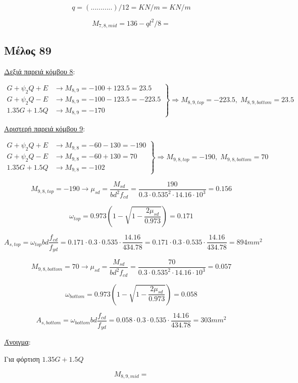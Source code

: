 \[
q = (...........)/12 =  KN/m =  KN/m
\]

\[
M_{7,8,mid} = 136 - ql^2/8 =
\]

\subsection{Μέλος 89}

\noindent
\underline{Δεξιά παρειά κόμβου 8}:

\[
\left.
   \begin{array}{ll}
       G+\psi_2 Q + Ε & \rightarrow M_{8,9} = -100+123.5 = 23.5 \\
       G+\psi_2 Q - Ε & \rightarrow M_{8,9} = -100-123.5 = -223.5 \\
       1.35G + 1.5Q     & \rightarrow M_{8,9} = -170
   \end{array}
\right \} \Rightarrow M_{8,9,top} = -223.5,\; M_{8,9,bottom} = 23.5
\]

\noindent
\underline{Αριστερή παρειά κόμβου 9}:

\[
\left.
   \begin{array}{ll}
       G+\psi_2 Q + Ε & \rightarrow M_{9,8} = -60-130 = -190 \\
       G+\psi_2 Q - Ε & \rightarrow M_{9,8} = -60+130 = 70 \\
       1.35G + 1.5Q     & \rightarrow M_{9,8} = -102
   \end{array}
\right \} \Rightarrow M_{9,8,top} = -190,\; M_{9,8,bottom} = 70
\]

\[
M_{9,8,top} = -190 \rightarrow \mu_{sd} = \dfrac{M_{sd}}{b d^2 f_{cd}} = \dfrac{190}{0.3\cdot0.535^2\cdot14.16\cdot10^3} = 0.156
\]

\[
\omega_{top} = 0.973\left( 1 - \sqrt{1 - \dfrac{2\mu_{sd}}{0.973}} \right) = 0.171
\]

\[
A_{s,top} = \omega_{top}b d \dfrac{f_{cd}}{f_{yd}} = 0.171\cdot 0.3 \cdot 0.535 \cdot \dfrac{14.16}{434.78} = 0.171\cdot 0.3 \cdot 0.535 \cdot \dfrac{14.16}{434.78} = 894mm^2
\]

\[
M_{9,8,bottom} = 70 \rightarrow \mu_{sd} = \dfrac{M_{sd}}{b d^2 f_{cd}} = \dfrac{70}{0.3\cdot0.535^2\cdot14.16\cdot10^3} = 0.057
\]

\[
\omega_{bottom} = 0.973\left( 1 - \sqrt{1 - \dfrac{2\mu_{sd}}{0.973}} \right) = 0.058
\]

\[
A_{s,bottom} = \omega_{bottom}b d \dfrac{f_{cd}}{f_{yd}} = 0.058\cdot 0.3 \cdot 0.535 \cdot \dfrac{14.16}{434.78} = 303mm^2
\]

\noindent
\underline{Άνοιγμα}:

\bigskip

\noindent
Για φόρτιση \(1.35G + 1.5Q\)

\[
M_{8,9,mid} =
\]
